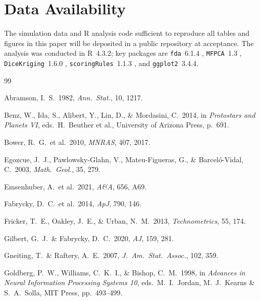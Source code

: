 \documentclass[12pt,a4paper]{article}
\begin{document}
\section*{Data Availability}
The simulation data and \textsf{R} analysis code sufficient to
reproduce all tables and figures in this paper will be deposited in a
public repository at acceptance.  The analysis was conducted in
\textsf{R}~4.3.2; key packages are \texttt{fda}~6.1.4
\citep{ramsay2005}, \texttt{MFPCA}~1.3 \citep{happ2018},
\texttt{DiceKriging}~1.6.0 \citep{roustant2012},
\texttt{scoringRules}~1.1.3 \citep{jordan2019}, and
\texttt{ggplot2}~3.4.4.

\begin{thebibliography}{99}

Abramson, I.~S.\ 1982, \textit{Ann.\ Stat.}, 10, 1217.

Benz, W., Ida, S., Alibert, Y., Lin, D., \& Mordasini, C.\ 2014,
in \textit{Protostars and Planets VI}, eds.\ H.\ Beuther et al.,
University of Arizona Press, p.\ 691.

Bower, R.~G.\ et al.\ 2010, \textit{MNRAS}, 407, 2017.

Egozcue, J.~J., Pawlowsky-Glahn, V., Mateu-Figueras, G., \&
Barcel\'{o}-Vidal, C.\ 2003, \textit{Math.\ Geol.}, 35, 279.

Emsenhuber, A.\ et al.\ 2021, \textit{A\&A}, 656, A69.

Fabrycky, D.~C.\ et al.\ 2014, \textit{ApJ}, 790, 146.

Fricker, T.~E., Oakley, J.~E., \& Urban, N.~M.\ 2013,
\textit{Technometrics}, 55, 174.

Gilbert, G.~J.\ \& Fabrycky, D.~C.\ 2020, \textit{AJ}, 159, 281.

Gneiting, T.\ \& Raftery, A.~E.\ 2007,
\textit{J.\ Am.\ Stat.\ Assoc.}, 102, 359.

Goldberg, P.~W., Williams, C.~K.~I., \& Bishop, C.~M.\ 1998,
in \textit{Advances in Neural Information Processing Systems 10},
eds.\ M.~I.\ Jordan, M.~J.\ Kearns \& S.~A.\ Solla,
MIT Press, pp.\ 493--499.


\end{thebibliography}
\end{document}
